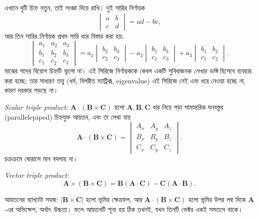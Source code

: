 \documentclass[11pt]{article}
\begin{document}
এখানে দুটি চিহ্ন নতুন, তাই সংজ্ঞা দিয়ে রাখি। দুই সারির নির্ণায়ক
\[
  \begin{vmatrix} a & b \\ c & d \end{vmatrix} = ad - bc ,
\]
আর তিন সারির নির্ণায়ক প্রথম সারি ধরে বিস্তার করা হয়:
\[
  \begin{vmatrix} a_{1} & a_{2} & a_{3} \\ b_{1} & b_{2} & b_{3} \\
  c_{1} & c_{2} & c_{3} \end{vmatrix}
  = a_{1}\begin{vmatrix} b_{2} & b_{3} \\ c_{2} & c_{3} \end{vmatrix}
  - a_{2}\begin{vmatrix} b_{1} & b_{3} \\ c_{1} & c_{3} \end{vmatrix}
  + a_{3}\begin{vmatrix} b_{1} & b_{2} \\ c_{1} & c_{2} \end{vmatrix} .
\]
মাঝের পদের বিয়োগ চিহ্নটি ভুলো না। এই সিরিজে নির্ণায়ককে কেবল একটি সুবিধাজনক
\emph{লেখার ভঙ্গি} হিসেবে ব্যবহার করা হচ্ছে; তার সাধারণ তত্ত্ব (ধর্ম, বিপরীত
ম্যাট্রিক্স, eigenvalue) এই সিরিজে নেই এবং ধরে নেওয়া হচ্ছে না, কারণ দরকার
পড়ছে না।

\begin{idea}[তিন পদের গুণ]
\emph{Scalar triple product:}
$\mathbf{A}\cdot\left( \mathbf{B}\times\mathbf{C} \right)$ হলো
$\mathbf{A}, \mathbf{B}, \mathbf{C}$ ধার নিয়ে গড়া সামান্তরিক ঘনবস্তুর
(parallelepiped) চিহ্নযুক্ত আয়তন, এবং তা লেখা যায়
\[
  \mathbf{A}\cdot\left( \mathbf{B}\times\mathbf{C} \right) =
  \begin{vmatrix} A_{x} & A_{y} & A_{z} \\ B_{x} & B_{y} & B_{z} \\
  C_{x} & C_{y} & C_{z} \end{vmatrix} .
\]
চক্রক্রমে ঘোরালে মান বদলায় না।

\emph{Vector triple product:}
\[
  \mathbf{A}\times\left( \mathbf{B}\times\mathbf{C} \right)
  = \mathbf{B}\left( \mathbf{A}\cdot\mathbf{C} \right)
  - \mathbf{C}\left( \mathbf{A}\cdot\mathbf{B} \right) .
\]
\end{idea}

আয়তনের ব্যাখ্যাটা সহজ: $|\mathbf{B}\times\mathbf{C}|$ হলো ভূমির ক্ষেত্রফল,
আর $\mathbf{A}\cdot\left( \mathbf{B}\times\mathbf{C} \right)$ হলো
ভূমির উপর লম্ব দিকে $\mathbf{A}$-এর অভিক্ষেপ, অর্থাৎ উচ্চতা। ফলে
আয়তনটি শূন্য হয় ঠিক তখনই, যখন তিনটি ভেক্টর একই সমতলে থাকে।
\end{document}
